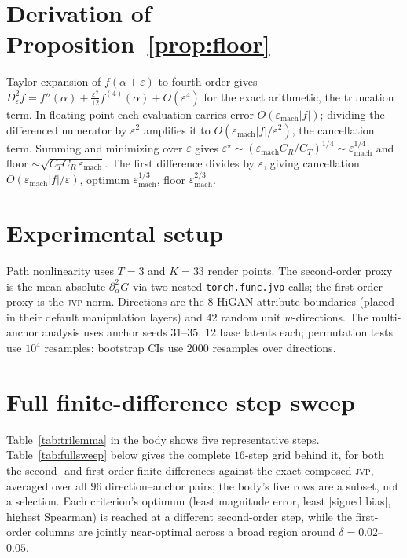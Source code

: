 \documentclass[10pt]{article}
\newcommand{\jvp}{\textsc{jvp}}
\newcommand{\eps}{\varepsilon}
\begin{document}



\newpage
\appendix
\section{Derivation of Proposition~\ref{prop:floor}}
\label{app:deriv}
Taylor expansion of $f(\alpha\pm\eps)$ to fourth order gives $D^2_\eps f = f''(\alpha) +
\tfrac{\eps^2}{12}f^{(4)}(\alpha)+O(\eps^4)$ for the exact arithmetic, the truncation term. In floating
point each evaluation carries error $O(\eps_{\mathrm{mach}}|f|)$; dividing the differenced numerator by
$\eps^2$ amplifies it to $O(\eps_{\mathrm{mach}}|f|/\eps^2)$, the cancellation term. Summing and
minimizing over $\eps$ gives $\eps^\star\sim(\eps_{\mathrm{mach}}C_R/C_T)^{1/4}\sim
\eps_{\mathrm{mach}}^{1/4}$ and floor $\sim\sqrt{C_TC_R\,\eps_{\mathrm{mach}}}$. The first difference
divides by $\eps$, giving cancellation $O(\eps_{\mathrm{mach}}|f|/\eps)$, optimum
$\eps_{\mathrm{mach}}^{1/3}$, floor $\eps_{\mathrm{mach}}^{2/3}$.

\section{Experimental setup}
\label{app:exp}
Path nonlinearity uses $T=3$ and $K=33$ render points. The second-order proxy is the mean absolute
$\partial^2_\alpha G$ via two nested \texttt{torch.func.jvp} calls; the first-order proxy is the \jvp{}
norm. Directions are the $8$ HiGAN attribute boundaries (placed in their default manipulation layers) and
$42$ random unit $w$-directions. The multi-anchor analysis uses anchor seeds $31$--$35$, $12$ base
latents each; permutation tests use $10^4$ resamples; bootstrap CIs use $2000$ resamples over directions.

\section{Full finite-difference step sweep}
\label{app:trilemma}
Table~\ref{tab:trilemma} in the body shows five representative steps. Table~\ref{tab:fullsweep} below
gives the complete $16$-step grid behind it, for both the second- and first-order finite differences
against the exact composed-\jvp{}, averaged over all $96$ direction--anchor pairs; the body's five rows
are a subset, not a selection. Each criterion's optimum (least magnitude error, least $|$signed bias$|$,
highest Spearman) is reached at a different second-order step, while the first-order columns are jointly
near-optimal across a broad region around $\delta=0.02$--$0.05$.
\end{document}
